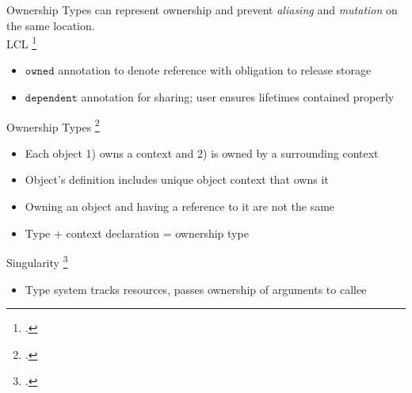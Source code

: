 \documentclass[aspectratio=169]{beamer}
\begin{document}
\begin{frame}{Ownership}
\footnotesize
   Types can represent \alert{ownership} and prevent \emph{aliasing} and \emph{mutation} on the same location.
   \\
   \vspace{0.1in}
   \pause
  LCL \footcite{evans_static_1996}
    \vspace{-0.1in}
    \begin{itemize}
        \item $\texttt{owned}$ annotation to denote reference with obligation to release storage
        \item $\texttt{dependent}$ annotation for sharing; user ensures lifetimes contained properly %
    \end{itemize}
  \pause
  Ownership Types \footcite{clarke_ownership_1998}
    \vspace{-0.1in}
    \begin{itemize}
      \item Each object 1) owns a context and 2) is owned by a surrounding context 
      \item Object's definition includes \alert{unique} object context that owns it
      \item Owning an object and having a reference to it are not the same
      \item Type + context declaration = \alert{ownership type}
    \end{itemize}
  \pause
  Singularity \footcite{fahndrich_language_2006}
    \vspace{-0.1in}
    \begin{itemize}
        \item Type system tracks resources, passes ownership of arguments to callee 
    \end{itemize}
  \vspace{0.1in}
\end{frame}
\end{document}
